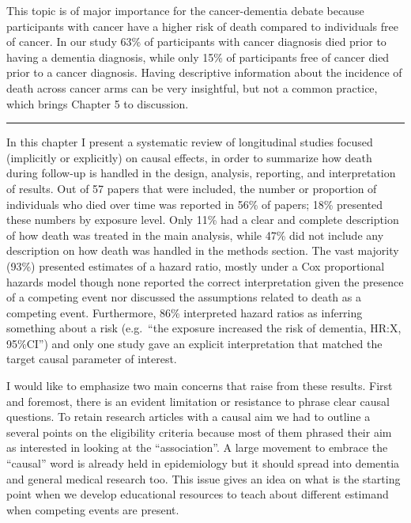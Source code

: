 \documentclass[
]{book}
\begin{document}
This topic is of major importance for the cancer-dementia debate because participants with cancer have a higher risk of death compared to individuals free of cancer. In our study 63\% of participants with cancer diagnosis died prior to having a dementia diagnosis, while only 15\% of participants free of cancer died prior to a cancer diagnosis. Having descriptive information about the incidence of death across cancer arms can be very insightful, but not a common practice, which brings Chapter 5 to discussion.

\begin{center}\rule{0.5\linewidth}{0.5pt}\end{center}

In this chapter I present a systematic review of longitudinal studies focused (implicitly or explicitly) on causal effects, in order to summarize how death during follow-up is handled in the design, analysis, reporting, and interpretation of results. Out of 57 papers that were included, the number or proportion of individuals who died over time was reported in 56\% of papers; 18\% presented these numbers by exposure level. Only 11\% had a clear and complete description of how death was treated in the main analysis, while 47\% did not include any description on how death was handled in the methods section. The vast majority (93\%) presented estimates of a hazard ratio, mostly under a Cox proportional hazards model though none reported the correct interpretation given the presence of a competing event nor discussed the assumptions related to death as a competing event. Furthermore, 86\% interpreted hazard ratios as inferring something about a risk (e.g.~``the exposure increased the risk of dementia, HR:X, 95\%CI'') and only one study gave an explicit interpretation that matched the target causal parameter of interest.

I would like to emphasize two main concerns that raise from these results.
First and foremost, there is an evident limitation or resistance to phrase clear causal questions. To retain research articles with a causal aim we had to outline a several points on the eligibility criteria because most of them phrased their aim as interested in looking at the ``association''. A large movement to embrace the ``causal'' word is already held in epidemiology\autocite{hernan_cword2018,hernan2019,goetghebeur,olarte2021} but it should spread into dementia and general medical research too. This issue gives an idea on what is the starting point when we develop educational resources to teach about different estimand when competing events are present.
\end{document}

